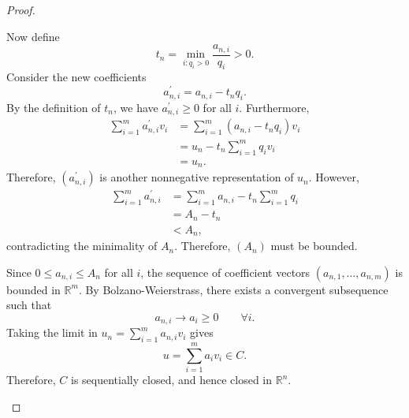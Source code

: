 \begin{proof}
\begin{enumerate}
\begin{enumerate}
						Now define
						\begin{equation}
							t_n = \min_{i \colon q_i > 0} \frac{a_{n,i}}{q_i} > 0.
						\end{equation}
						Consider the new coefficients
						\begin{equation}
							a_{n,i}^{\prime} = a_{n,i} - t_n q_i.
						\end{equation}
						By the definition of $t_n$, we have $a_{n,i}^{\prime} \geq 0$ for all $i$. Furthermore,
						\begin{align}
							\sum_{i=1}^m a_{n,i}^{\prime} v_i
							&= \sum_{i=1}^m (a_{n,i} - t_n q_i)v_i \\
							&= u_n - t_n \sum_{i=1}^m q_i v_i \\
							&= u_n.
						\end{align}
						Therefore, $(a_{n,i}^{\prime})$ is another nonnegative representation of $u_n$. However,
						\begin{align}
							\sum_{i=1}^m a_{n,i}^{\prime}
							&= \sum_{i=1}^m a_{n,i}
								- t_n \sum_{i=1}^m q_i \\
							&= A_n - t_n \\
							&< A_n,
						\end{align}
						contradicting the minimality of $A_n$. Therefore, $(A_n)$ must be bounded.

						Since $0 \leq a_{n,i} \leq A_n$ for all $i$, the sequence of coefficient vectors $(a_{n,1},\ldots,a_{n,m})$ is bounded in $\mathbb{R}^m$. By Bolzano-Weierstrass, there exists a convergent subsequence such that
						\begin{equation}
							a_{n,i} \to a_i \geq 0
							\qquad \forall i.
						\end{equation}
						Taking the limit in
						$u_n = \sum_{i=1}^m a_{n,i}v_i$ gives
						\begin{equation}
							u = \sum_{i=1}^m a_i v_i \in C.
						\end{equation}
						Therefore, $C$ is sequentially closed, and hence closed in $\mathbb{R}^n$.
				\end{enumerate}


\end{enumerate}
\end{proof}

